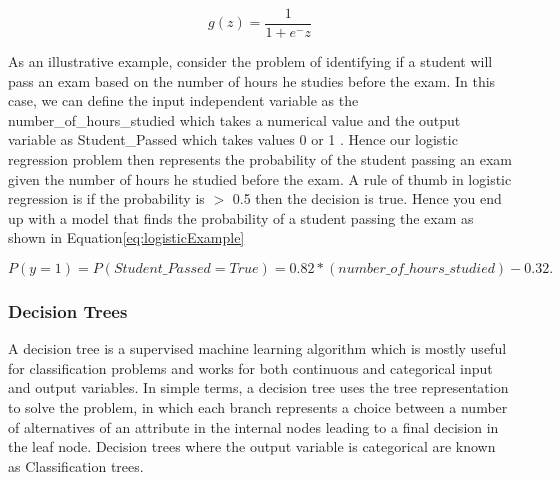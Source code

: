 \documentclass[11pt,openright]{report}
\begin{document}
\begin{equation}
 g(z) =  \frac{\mathrm{1} }{\mathrm{1} + e^- z }  \label{eq:sigmoid} 
 \end{equation}

As an illustrative example, consider the problem of identifying if a student will pass an exam based on the number of hours he studies before the exam. In this case, we can define the input independent variable as the number\_of\_hours\_studied which takes a numerical value and the output variable as Student\_Passed which takes values { 0 or 1 }. Hence our logistic regression problem then represents the probability of the student passing an exam given the number of hours he studied before the exam. A rule of thumb in logistic regression is if the probability is $>$ 0.5 then the decision is true. Hence you end up with a model that finds the probability of a student passing the exam  as shown in Equation\ref{eq:logisticExample}

\begin{equation}
 P(y=1) = P(Student\_Passed= True) = 0.82 * (number\_of\_hours\_studied) -0.32.  \label{eq:logisticExample} 
 \end{equation}


\subsubsection {Decision Trees}

A decision tree is a supervised machine learning algorithm which is mostly useful for classification problems and works for both continuous and categorical input and output variables. In simple terms, a decision tree uses the tree representation to solve the problem, in which each branch represents a choice between a number of alternatives of an attribute in the internal nodes leading to a final decision in the leaf node. Decision trees where the output variable is categorical are known as Classification trees.
\end{document}
